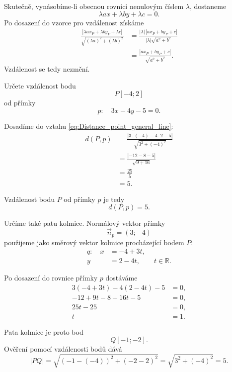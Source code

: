 Skutečně, vynásobíme-li obecnou rovnici nenulovým číslem
$\lambda$, dostaneme
\[
    \lambda ax+\lambda by+\lambda c=0.
\]
Po dosazení do vzorce pro vzdálenost získáme
\begin{align*}
    \frac{|\lambda ax_P+\lambda by_P+\lambda c|}
    {\sqrt{(\lambda a)^2+(\lambda b)^2}}
    &=
    \frac{|\lambda|\,|ax_P+by_P+c|}
    {|\lambda|\sqrt{a^2+b^2}}\\
    &=
    \frac{|ax_P+by_P+c|}{\sqrt{a^2+b^2}}.
\end{align*}
Vzdálenost se tedy nezmění.

\begin{example}\label{exa:Basic_distance_point_line}
    Určete vzdálenost bodu
    \[
        P[-4;2]
    \]
    od přímky
    \[
        p:\quad 3x-4y-5=0.
    \]

    Dosadíme do vztahu \eqref{eq:Distance_point_general_line}:
    \begin{align*}
        d(P,p)
        &=
        \frac{|3\cdot(-4)-4\cdot2-5|}
        {\sqrt{3^2+(-4)^2}}\\
        &=
        \frac{|-12-8-5|}{\sqrt{9+16}}\\
        &=
        \frac{25}{5}\\
        &=5.
    \end{align*}

    Vzdálenost bodu $P$ od přímky $p$ je tedy
    \[
        d(P,p)=5.
    \]

    Určíme také patu kolmice. Normálový vektor přímky
    \[
        \vec{n}_p=(3;-4)
    \]
    použijeme jako směrový vektor kolmice procházející bodem $P$:
    \[
        \begin{aligned}
            q:\quad x&=-4+3t,\\
                     y&=2-4t,
                     \qquad t\in\mathbb{R}.
        \end{aligned}
    \]

    Po dosazení do rovnice přímky $p$ dostáváme
    \begin{align*}
        3(-4+3t)-4(2-4t)-5&=0,\\
        -12+9t-8+16t-5&=0,\\
        25t-25&=0,\\
        t&=1.
    \end{align*}

    Pata kolmice je proto bod
    \[
        Q[-1;-2].
    \]
    Ověření pomocí vzdálenosti bodů dává
    \[
        |PQ|
        =
        \sqrt{(-1-(-4))^2+(-2-2)^2}
        =
        \sqrt{3^2+(-4)^2}
        =5.
    \]
\end{example}


